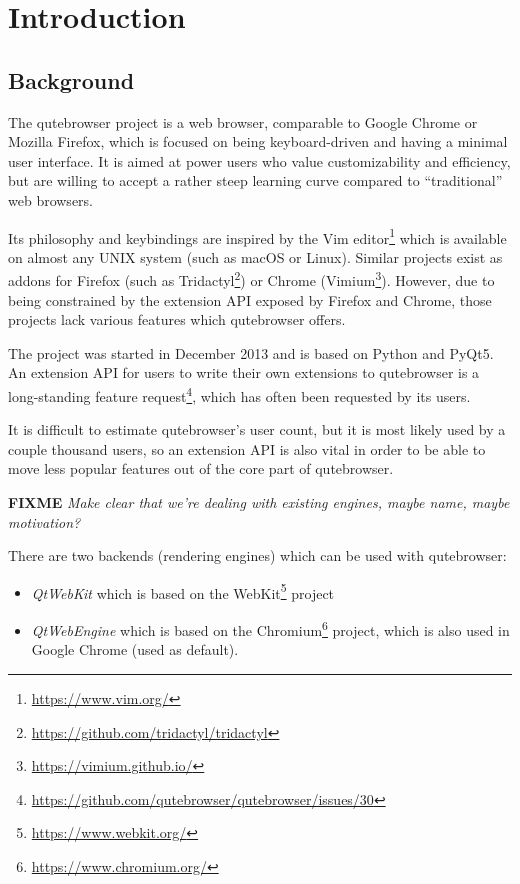 \documentclass[a4paper,parskip=full]{scrreprt}
\newcommand{\fixme}[1]{\textbf{FIXME} \emph{#1}}
\begin{document}
\chapter{Introduction}
\label{ch:intro}

\section{Background}

The qutebrowser project is a web browser, comparable to Google Chrome or Mozilla
Firefox, which is focused on being keyboard-driven and having a minimal user
interface. It is aimed at power users who value customizability and efficiency,
but are willing to accept a rather steep learning curve compared to
``traditional'' web browsers.

Its philosophy and keybindings are inspired by the Vim
editor\footnote{\url{https://www.vim.org/}} which is available on almost any
UNIX system (such as macOS or Linux). Similar projects exist as addons for
Firefox (such as Tridactyl\footnote{\url{https://github.com/tridactyl/tridactyl}})
or Chrome (Vimium\footnote{\url{https://vimium.github.io/}}). However, due to
being constrained by the extension API exposed by Firefox and Chrome, those
projects lack various features which qutebrowser offers.

The project was started in December 2013 and is based on Python and PyQt5. An
extension API for users to write their own extensions to qutebrowser is a
long-standing feature
request\footnote{\url{https://github.com/qutebrowser/qutebrowser/issues/30}},
which has often been requested by its users.

It is difficult to estimate qutebrowser's user count, but it is most likely used by a
couple thousand users, so an extension API is also vital in order to be able to move
less popular features out of the core part of qutebrowser.

\fixme{Make clear that we're dealing with existing engines, maybe name, maybe motivation?}

\label{backends}
There are two backends (rendering engines) which can be used with qutebrowser:

\begin{itemize}
  \item \emph{QtWebKit} which is based on the
  WebKit\footnote{\url{https://www.webkit.org/}} project
  \item \emph{QtWebEngine} which is based on the
  Chromium\footnote{\url{https://www.chromium.org/}} project, which is also used
  in Google Chrome (used as default).
\end{itemize}
\end{document}
